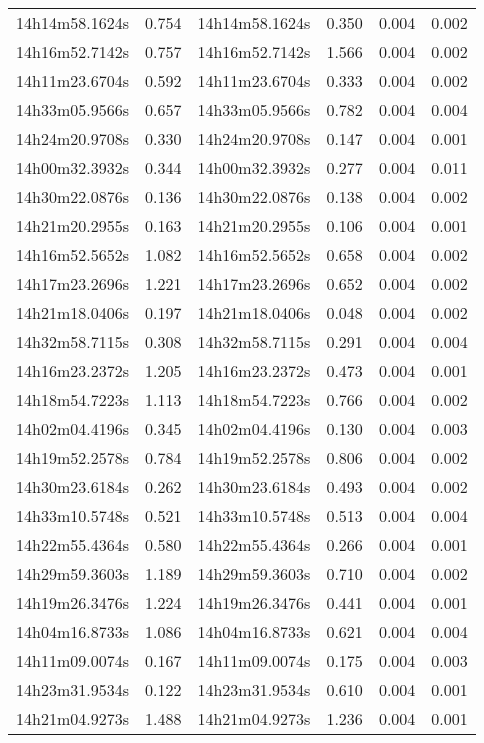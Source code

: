 \begin{table}
\begin{tabular}{cccccc}
14h14m58.1624s & 0.754 & 14h14m58.1624s & 0.350 & 0.004 & 0.002 \\
14h16m52.7142s & 0.757 & 14h16m52.7142s & 1.566 & 0.004 & 0.002 \\
14h11m23.6704s & 0.592 & 14h11m23.6704s & 0.333 & 0.004 & 0.002 \\
14h33m05.9566s & 0.657 & 14h33m05.9566s & 0.782 & 0.004 & 0.004 \\
14h24m20.9708s & 0.330 & 14h24m20.9708s & 0.147 & 0.004 & 0.001 \\
14h00m32.3932s & 0.344 & 14h00m32.3932s & 0.277 & 0.004 & 0.011 \\
14h30m22.0876s & 0.136 & 14h30m22.0876s & 0.138 & 0.004 & 0.002 \\
14h21m20.2955s & 0.163 & 14h21m20.2955s & 0.106 & 0.004 & 0.001 \\
14h16m52.5652s & 1.082 & 14h16m52.5652s & 0.658 & 0.004 & 0.002 \\
14h17m23.2696s & 1.221 & 14h17m23.2696s & 0.652 & 0.004 & 0.002 \\
14h21m18.0406s & 0.197 & 14h21m18.0406s & 0.048 & 0.004 & 0.002 \\
14h32m58.7115s & 0.308 & 14h32m58.7115s & 0.291 & 0.004 & 0.004 \\
14h16m23.2372s & 1.205 & 14h16m23.2372s & 0.473 & 0.004 & 0.001 \\
14h18m54.7223s & 1.113 & 14h18m54.7223s & 0.766 & 0.004 & 0.002 \\
14h02m04.4196s & 0.345 & 14h02m04.4196s & 0.130 & 0.004 & 0.003 \\
14h19m52.2578s & 0.784 & 14h19m52.2578s & 0.806 & 0.004 & 0.002 \\
14h30m23.6184s & 0.262 & 14h30m23.6184s & 0.493 & 0.004 & 0.002 \\
14h33m10.5748s & 0.521 & 14h33m10.5748s & 0.513 & 0.004 & 0.004 \\
14h22m55.4364s & 0.580 & 14h22m55.4364s & 0.266 & 0.004 & 0.001 \\
14h29m59.3603s & 1.189 & 14h29m59.3603s & 0.710 & 0.004 & 0.002 \\
14h19m26.3476s & 1.224 & 14h19m26.3476s & 0.441 & 0.004 & 0.001 \\
14h04m16.8733s & 1.086 & 14h04m16.8733s & 0.621 & 0.004 & 0.004 \\
14h11m09.0074s & 0.167 & 14h11m09.0074s & 0.175 & 0.004 & 0.003 \\
14h23m31.9534s & 0.122 & 14h23m31.9534s & 0.610 & 0.004 & 0.001 \\
14h21m04.9273s & 1.488 & 14h21m04.9273s & 1.236 & 0.004 & 0.001 \\

\end{tabular}
\end{table}
